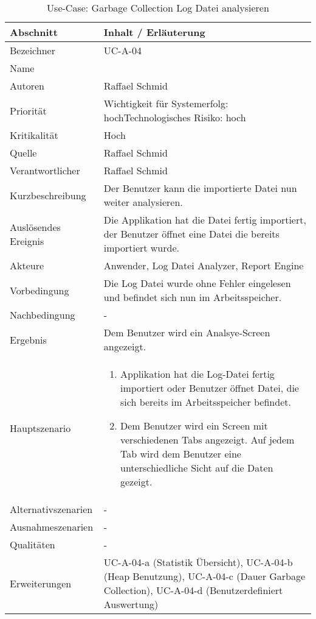 \begin{longtable}{|p{4cm}|p{10.5cm}|}
\caption{Use-Case: Garbage Collection Log Datei analysieren}\\\hline
   \textbf{Abschnitt} & \textbf{Inhalt / Erläuterung} \\\hline
   Bezeichner & UC-A-04\\\hline
   Name & \\\hline
   Autoren & Raffael Schmid\\\hline
   Priorität & Wichtigkeit für Systemerfolg: hoch\newline Technologisches Risiko: hoch\\\hline
   Kritikalität & Hoch\\\hline
   Quelle & Raffael Schmid\\\hline
   Verantwortlicher & Raffael Schmid\\\hline
   Kurzbeschreibung & Der Benutzer kann die importierte Datei nun weiter analysieren.\\\hline
   Auslösendes Ereignis & Die Applikation hat die Datei fertig importiert, der Benutzer öffnet eine Datei die bereits importiert wurde.\\\hline
   Akteure & Anwender, Log Datei Analyzer, Report Engine\\\hline
   Vorbedingung & Die Log Datei wurde ohne Fehler eingelesen und befindet sich nun im Arbeitsspeicher.\\\hline
   Nachbedingung & -\\\hline
   Ergebnis & Dem Benutzer wird ein Analsye-Screen angezeigt.\\\hline
   Hauptszenario & 
	\begin{enumerate}
		\item Applikation hat die Log-Datei fertig importiert oder Benutzer öffnet Datei, die sich bereits im Arbeitsspeicher befindet.
		\item Dem Benutzer wird ein Screen mit verschiedenen Tabs angezeigt. Auf jedem Tab wird dem Benutzer eine unterschiedliche Sicht auf die Daten gezeigt.
	\end{enumerate}
	\\\hline
   Alternativszenarien & -\\\hline
   Ausnahmeszenarien & -\\\hline
   Qualitäten & -\\\hline
   Erweiterungen & UC-A-04-a (Statistik Übersicht), UC-A-04-b (Heap Benutzung), UC-A-04-c (Dauer Garbage Collection), UC-A-04-d (Benutzerdefiniert Auswertung) \\\hline
\end{longtable}

